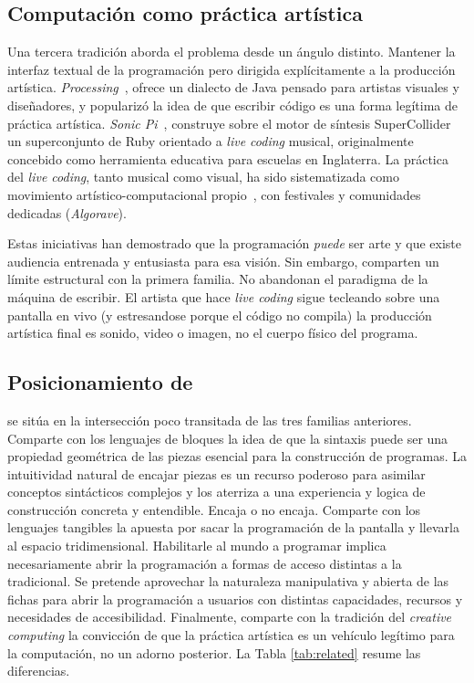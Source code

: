 \subsection{Computaci\'on como pr\'actica art\'istica}
\label{sec:related:art}

Una tercera tradici\'on aborda el problema desde un \'angulo distinto.
Mantener la interfaz textual de la programaci\'on pero dirigida
expl\'icitamente a la producci\'on art\'istica. \emph{Processing}~\cite{reas07processing}, ofrece un dialecto de Java pensado
para artistas visuales y dise\~nadores, y populariz\'o la idea de que
escribir c\'odigo es una forma leg\'itima de pr\'actica art\'istica.
\emph{Sonic Pi}~\cite{aaron16sonicpi}, construye
sobre el motor de s\'intesis SuperCollider un superconjunto de Ruby
orientado a \emph{live coding} musical, originalmente concebido como
herramienta educativa para escuelas en Inglaterra. La pr\'actica del
\emph{live coding}, tanto musical como visual, ha sido sistematizada
como movimiento art\'istico-computacional propio~\cite{collins03livecoding},
con festivales y comunidades dedicadas (\eg \emph{Algorave}).

Estas iniciativas han demostrado que la programaci\'on \emph{puede} ser
arte y que existe audiencia entrenada y entusiasta para esa visi\'on.
Sin embargo, comparten un l\'imite estructural con la primera familia.
No abandonan el paradigma de la m\'aquina de escribir. El artista que
hace \emph{live coding} sigue tecleando sobre una pantalla en vivo (y estresandose porque el c\'odigo no compila)
la producci\'on art\'istica final es sonido, video o imagen, no el cuerpo f\'isico del
programa.

\subsection{Posicionamiento de \sculpt}
\label{sec:related:positioning}

\sculpt se sit\'ua en la intersecci\'on poco transitada de las tres
familias anteriores. Comparte con los lenguajes de bloques la idea de
que la sintaxis puede ser una propiedad geom\'etrica de las piezas
esencial para la construcci\'on de programas. La intuitividad natural de encajar piezas
es un recurso poderoso para asimilar conceptos sint\'acticos complejos y los aterriza a una
experiencia y logica de construcci\'on concreta y entendible. Encaja o no encaja.
Comparte con los lenguajes tangibles la apuesta por sacar la programaci\'on de la 
pantalla y llevarla al espacio tridimensional.
Habilitarle al mundo a programar implica necesariamente abrir la programaci\'on a formas
de acceso distintas a la tradicional. Se pretende aprovechar la naturaleza manipulativa y abierta
de las fichas para abrir la programaci\'on a usuarios con distintas capacidades, recursos
y necesidades de accesibilidad.
Finalmente, comparte con la tradici\'on del \emph{creative computing} la convicci\'on
de que la pr\'actica art\'istica es un veh\'iculo leg\'itimo para la
computaci\'on, no un adorno posterior. La Tabla \ref{tab:related} resume
las diferencias.

